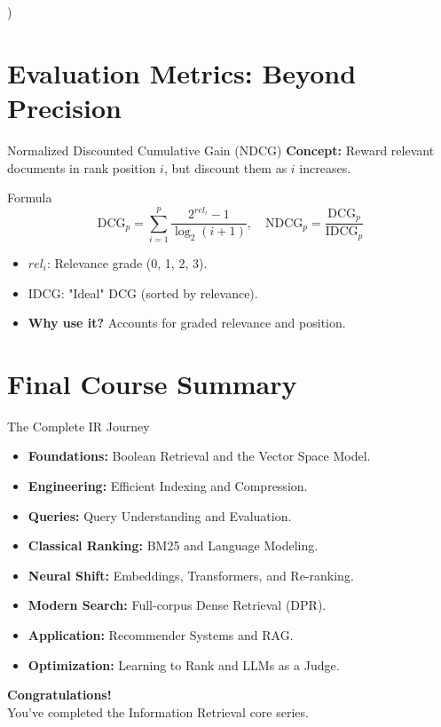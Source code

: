 \documentclass[aspectratio=169]{beamer}
\begin{document}
) %
\section{Evaluation Metrics: Beyond Precision}

\begin{frame}{Normalized Discounted Cumulative Gain (NDCG)}
\textbf{Concept:} Reward relevant documents in rank position $i$, but discount them as $i$ increases.

\vspace{1em}
\begin{block}{Formula}
$$\text{DCG}_p = \sum_{i=1}^p \frac{2^{rel_i} - 1}{\log_2(i+1)}, \quad \text{NDCG}_p = \frac{\text{DCG}_p}{\text{IDCG}_p}$$
\end{block}

\vspace{1em}
\begin{itemize}
    \item $rel_i$: Relevance grade (0, 1, 2, 3).
    \item IDCG: "Ideal" DCG (sorted by relevance).
    \item \textbf{Why use it?} Accounts for graded relevance and position.
\end{itemize}
\end{frame}

\section{Final Course Summary}

\begin{frame}{The Complete IR Journey}
\begin{itemize}
    \item \textbf{Foundations:} Boolean Retrieval and the Vector Space Model.
    \item \textbf{Engineering:} Efficient Indexing and Compression.
    \item \textbf{Queries:} Query Understanding and Evaluation.
    \item \textbf{Classical Ranking:} BM25 and Language Modeling.
    \item \textbf{Neural Shift:} Embeddings, Transformers, and Re-ranking.
    \item \textbf{Modern Search:} Full-corpus Dense Retrieval (DPR).
    \item \textbf{Application:} Recommender Systems and RAG.
    \item \textbf{Optimization:} Learning to Rank and LLMs as a Judge.
\end{itemize}

\vspace{1em}
\begin{center}
\huge \textbf{Congratulations!} \\
\large You've completed the Information Retrieval core series.
\end{center}
\end{frame}
\end{document}
